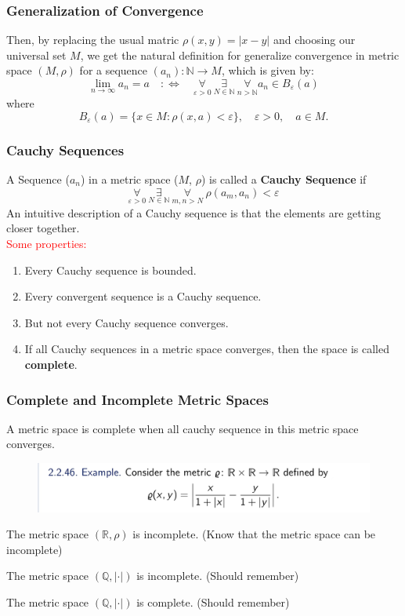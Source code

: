\documentclass{beamer}
\begin{document}
\begin{frame}
    \frametitle{Generalization of Convergence}
    Then, by replacing the usual matric $\rho(x,y)=|x-y|$ and choosing our universal set $M$, we get the natural definition for
    generalize convergence in metric space $(M,\rho)$ for a sequence $(a_n):\mathbb{N}\rightarrow M$, which is given by:
    \begin{equation*}
        \lim_{n\rightarrow \infty}a_n=a\quad :\Leftrightarrow \quad \underset{\varepsilon>0}{\forall}\ \underset{N\in \mathbb{N}}{\exists}\ \underset{n>\mathbb{N}}{\forall} a_n\in B_\varepsilon(a)
    \end{equation*}
    where
    \begin{equation*}
        B_\varepsilon(a)=\{ x\in M:\rho(x,a)<\varepsilon\},\quad \varepsilon>0,\quad a\in M.
    \end{equation*}
\end{frame}

\begin{frame}
    \frametitle{Cauchy Sequences}
    A Sequence ($a_n$) in a metric space ($M$, $\rho$) is called a
    \textbf{Cauchy Sequence} if
    $$\underset{\varepsilon>0}{\forall} ~\underset{N \in \mathbb{N}}{\exists}~\underset{m,n>N}{\forall} ~\rho(a_m,a_n)<\varepsilon$$
    An intuitive description of a Cauchy sequence is that the elements are
    getting closer together.\\
    \vspace{1em}
    \textcolor{red}{Some properties:}
    \begin{enumerate}
        \item Every Cauchy sequence is bounded.
        \item Every convergent sequence is a Cauchy sequence.
        \item But not every Cauchy sequence converges.
        \item If all Cauchy sequences in a metric space converges,
              then the space is called \textbf{complete}.
    \end{enumerate}
\end{frame}

\begin{frame}
    \frametitle{Complete and Incomplete Metric Spaces}
    A metric space is complete when all cauchy sequence in this metric space converges.
    \begin{figure}[htbp]
        \centering
        \includegraphics[width=12cm]{complete.png}
    \end{figure}
    The metric space $(\mathbb{R},\rho)$ is incomplete. (Know that the metric space can be incomplete)

    The metric space $(\mathbb{Q},\left|\cdot\right|)$ is incomplete. (Should remember)

    The metric space $(\mathbb{Q},\left|\cdot\right|)$ is complete. (Should remember)
\end{frame}
\end{document}
